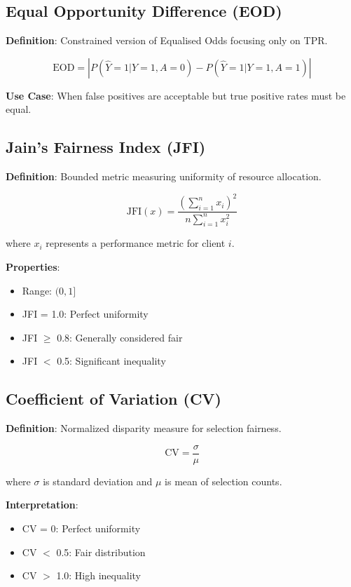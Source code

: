\documentclass{article}
\begin{document}
\subsection{Equal Opportunity Difference (EOD)}

\textbf{Definition}: Constrained version of Equalised Odds focusing only on TPR.

\begin{equation}
\text{EOD} = \left| P(\hat{Y}=1|Y=1,A=0) - P(\hat{Y}=1|Y=1,A=1) \right|
\end{equation}

\textbf{Use Case}: When false positives are acceptable but true positive rates must be equal.

\subsection{Jain's Fairness Index (JFI)}

\textbf{Definition}: Bounded metric measuring uniformity of resource allocation.

\begin{equation}
\text{JFI}(x) = \frac{\left(\sum_{i=1}^{n} x_i\right)^2}{n \sum_{i=1}^{n} x_i^2}
\end{equation}

where $x_i$ represents a performance metric for client $i$.

\textbf{Properties}:
\begin{itemize}
    \item Range: $(0, 1]$
    \item JFI = 1.0: Perfect uniformity
    \item JFI $\geq$ 0.8: Generally considered fair
    \item JFI $<$ 0.5: Significant inequality
\end{itemize}

\subsection{Coefficient of Variation (CV)}

\textbf{Definition}: Normalized disparity measure for selection fairness.

\begin{equation}
\text{CV} = \frac{\sigma}{\mu}
\end{equation}

where $\sigma$ is standard deviation and $\mu$ is mean of selection counts.

\textbf{Interpretation}:
\begin{itemize}
    \item CV = 0: Perfect uniformity
    \item CV $<$ 0.5: Fair distribution
    \item CV $>$ 1.0: High inequality
\end{itemize}
\end{document}
